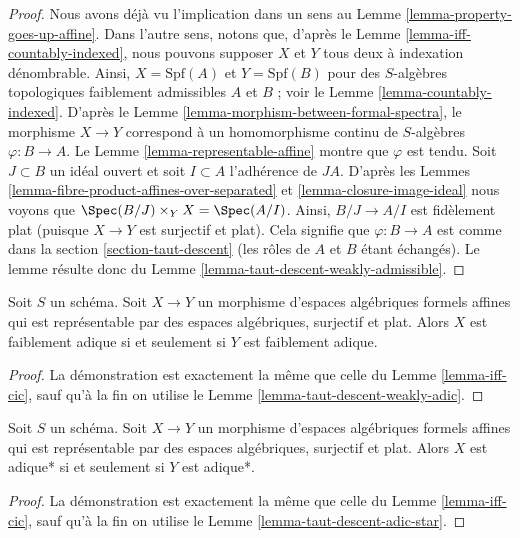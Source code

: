 \begin{proof}
Nous avons déjà vu l'implication dans un sens au
Lemme \ref{lemma-property-goes-up-affine}. Dans l'autre sens,
notons que, d'après le Lemme \ref{lemma-iff-countably-indexed}, nous pouvons supposer
$X$ et $Y$ tous deux à indexation dénombrable. Ainsi, $X = \text{Spf}(A)$
et $Y = \text{Spf}(B)$ pour des $S$-algèbres topologiques faiblement
admissibles $A$ et $B$ ; voir le Lemme \ref{lemma-countably-indexed}.
D'après le Lemme \ref{lemma-morphism-between-formal-spectra},
le morphisme $X \to Y$ correspond à un homomorphisme continu de $S$-algèbres
$\varphi : B \to A$. Le
Lemme \ref{lemma-representable-affine} montre que $\varphi$ est tendu.
Soit $J \subset B$ un idéal ouvert et soit $I \subset A$
l'adhérence de $JA$. D'après les
Lemmes \ref{lemma-fibre-product-affines-over-separated} et
\ref{lemma-closure-image-ideal}
nous voyons que $\Spec(B/J) \times_Y X = \Spec(A/I)$.
Ainsi, $B/J \to A/I$ est fidèlement plat (puisque $X \to Y$ est surjectif
et plat). Cela signifie que $\varphi : B \to A$ est comme dans la
section \ref{section-taut-descent} (les rôles de $A$ et $B$ étant échangés).
Le lemme résulte donc du
Lemme \ref{lemma-taut-descent-weakly-admissible}.
\end{proof}

\begin{lemma}
\label{lemma-iff-weakly-adic}
Soit $S$ un schéma. Soit $X \to Y$ un morphisme d'espaces algébriques
formels affines qui est représentable par des espaces algébriques,
surjectif et plat. Alors $X$ est faiblement adique
si et seulement si $Y$ est faiblement adique.
\end{lemma}

\begin{proof}
La démonstration est exactement la même que celle du
Lemme \ref{lemma-iff-cic}, sauf qu'à la fin on utilise le
Lemme \ref{lemma-taut-descent-weakly-adic}.
\end{proof}

\begin{lemma}
\label{lemma-iff-adic-star}
Soit $S$ un schéma. Soit $X \to Y$ un morphisme d'espaces algébriques
formels affines qui est représentable par des espaces algébriques,
surjectif et plat. Alors $X$ est adique* si et seulement si $Y$ est adique*.
\end{lemma}

\begin{proof}
La démonstration est exactement la même que celle du
Lemme \ref{lemma-iff-cic}, sauf qu'à la fin on utilise le
Lemme \ref{lemma-taut-descent-adic-star}.
\end{proof}

